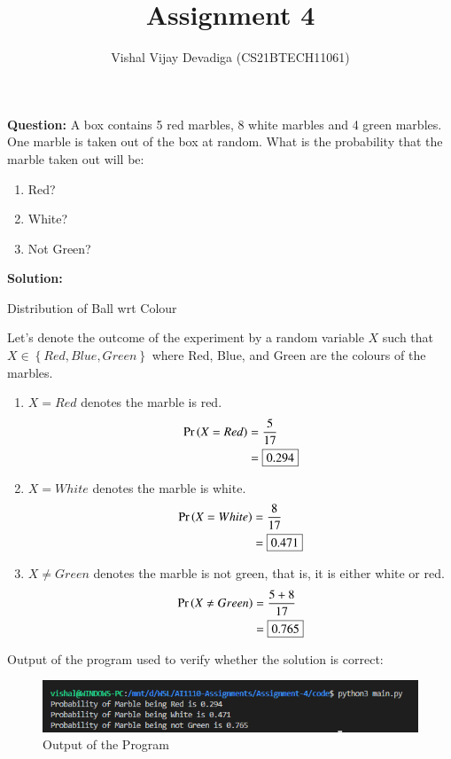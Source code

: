\documentclass[journal,12pt,twocolumn]{IEEEtran}
\title{Assignment 4}
\author{Vishal Vijay Devadiga (CS21BTECH11061)}
\date{}
\providecommand{\pr}[1]{\ensuremath{\Pr\left(#1\right)}}
\providecommand{\cbrak}[1]{\ensuremath{\left\{#1\right\}}}
\newcommand{\question}{\noindent \textbf{Question: }}
\newcommand{\solution}{\noindent \textbf{Solution: }}
\begin{document}
\maketitle
\question
A box contains 5 red marbles, 8 white marbles and 4 green marbles. One marble is taken
out of the box at random. What is the probability that the marble taken out will be:
\begin{enumerate}[label=(\roman{enumi})]
	\item Red?
	\item White?
	\item Not Green?
\end{enumerate}
\solution
\begin{table}[H]
	
	\caption{Distribution of Ball wrt Colour}
	\label{tab1}
\end{table}
Let's denote the outcome of the experiment by a random variable $X$ such that
$X \in \cbrak{Red , Blue, Green}$ where Red, Blue, and Green are the colours of the marbles.
\begin{enumerate}
    \item $X = Red$ denotes the marble is red.
    \begin{align}
        \pr{X = Red} & = \frac{5}{17} 
	    \\
	    & = \fbox{0.294}
    \end{align}
    \item $X = White$ denotes the marble is white.
    \begin{align}
        \pr{X = White} & = \frac{8}{17} 
	    \\
	    & = \fbox{0.471}
    \end{align}
    \item $X \not = Green$ denotes the marble is not green, that is, it is either white or red.
    \begin{align}
        \pr{X \not = Green} & = \frac{5+8}{17}
	    \\
	    & = \fbox{0.765}
    \end{align}
\end{enumerate}
Output of the program used to verify whether the solution is correct:
\begin{figure}[H]
	\centering
	\includegraphics[width = \columnwidth]{./figure/Output.png}
	\caption{Output of the Program}
	\label{fig1}
\end{figure}
\end{document}

